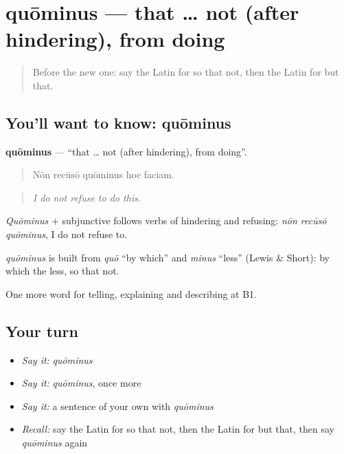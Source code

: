 \section[quōminus]{quōminus — that … not (after hindering), from doing}

\label{lesson:LA-C367-quominus}



\begin{quote}
Before the new one: say the Latin for so that not, then the Latin for but that.
\end{quote}

\subsection*{You'll want to know: quōminus}
\textbf{quōminus} — \textquotedblleft{}that … not (after hindering), from doing\textquotedblright{}.

\begin{quote}
Nōn recūsō quōminus hoc faciam.
\end{quote}

\begin{quote}
\emph{I do not refuse to do this.}
\end{quote}

\emph{Quōminus} + subjunctive follows verbs of hindering and refusing: \emph{nōn recūsō quōminus}, I do not refuse to.

\begin{cousinweb}
\emph{quōminus} is built from \emph{quō} \textquotedblleft{}by which\textquotedblright{} and \emph{minus} \textquotedblleft{}less\textquotedblright{} (Lewis \& Short): by which the less, so that not.
\end{cousinweb}

\begin{grammarlens}[title={What you've built}]
One more word for telling, explaining and describing at B1.
\end{grammarlens}

\subsection*{Your turn}
\begin{itemize}
\raggedright
  \item \emph{Say it:} \emph{quōminus}
  \item \emph{Say it:} \emph{quōminus}, once more
  \item \emph{Say it:} a sentence of your own with \emph{quōminus}
  \item \emph{Recall:} say the Latin for so that not, then the Latin for but that, then say \emph{quōminus} again
\end{itemize}

